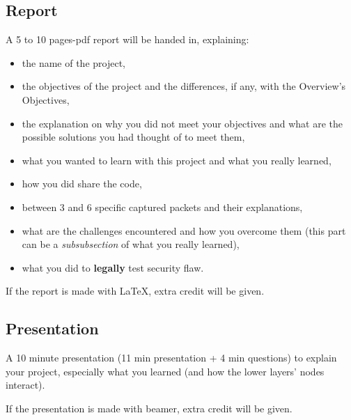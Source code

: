 \documentclass[11pt]{article}
\begin{document}
\subsection{Report}
A 5 to 10 pages-pdf report will be handed in, explaining:
  \begin{itemize}
    \item the name of the project,
    \item the objectives of the project and the differences, if any, with the Overview's Objectives,
    \item the explanation on why you did not meet your objectives and what are the possible solutions you had thought of to meet them,
    \item what you wanted to learn with this project and what you really learned,
    \item how you did share the code,
    \item between 3 and 6 specific captured packets and their explanations,
    \item what are the challenges encountered and how you overcome them (this part can be a \emph{subsubsection} of what you really learned),
    \item what you did to {\bf legally} test security flaw.
  \end{itemize}
If the report is made with \LaTeX, extra credit will be given.

\subsection{Presentation}
A 10 minute presentation (11 min presentation + 4 min questions) to explain your project, especially what you learned (and how the lower layers' nodes interact).

If the presentation is made with beamer, extra credit will be given.
\end{document}
